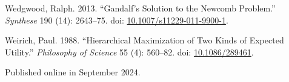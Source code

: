 \documentclass[
  10pt,
  letterpaper,
  DIV=11,
  numbers=noendperiod,
  twoside]{scrartcl}
\newlength{\cslhangindent}
\newenvironment{CSLReferences}[2] %
 {\begin{list}{}{%
  \setlength{\itemindent}{0pt}
  \setlength{\leftmargin}{0pt}
  \setlength{\parsep}{0pt}
  \ifodd #1
   \setlength{\leftmargin}{\cslhangindent}
   \setlength{\itemindent}{-1\cslhangindent}
  \fi
  \setlength{\itemsep}{#2\baselineskip}}}
 {\end{list}}
\begin{document}
\begin{CSLReferences}{1}{0}
Wedgwood, Ralph. 2013. {``Gandalf's Solution to the Newcomb Problem.''}
\emph{Synthese} 190 (14): 2643--75. doi:
\href{https://doi.org/10.1007/s11229-011-9900-1}{10.1007/s11229-011-9900-1}.

Weirich, Paul. 1988. {``Hierarchical Maximization of Two Kinds of
Expected Utility.''} \emph{Philosophy of Science} 55 (4): 560--82. doi:
\href{https://doi.org/10.1086/289461}{10.1086/289461}.

\end{CSLReferences}



\noindent Published online in September 2024.
\end{document}
